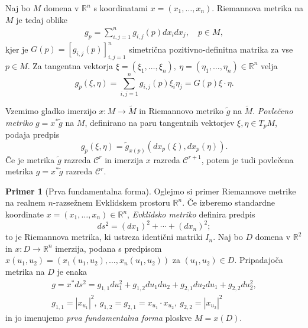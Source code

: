 \documentclass[12pt,a4paper,twoside]{article}
\theoremstyle{definition} %
\newtheorem{primer}[definicija]{Primer}
\theoremstyle{plain} %
\numberwithin{equation}{section}  %
\newcommand{\R}{\mathbb R}
\begin{document}
Naj bo $M$ domena v $\R^{n}$ s koordinatami $x = (x_{1}, \dots, x_{n})$. Riemannova metrika na $M$ je tedaj oblike
\begin{align}
g_{p} = \sum_{i,j=1}^{n} g_{i,j}(p) dx_{i} dx_{j}, \quad p \in M,
\end{align}
kjer je $G(p) = [g_{i,j}(p)]_{i,j=1}^{n}$ simetrična pozitivno-definitna matrika za vse $p \in M$. Za tangentna vektorja $\xi = (\xi_{1}, \dots, \xi_{n}), \ \eta = (\eta_{1}, \dots, \eta_{n}) \in \R^{n}$ velja
\begin{equation}
g_{p}(\xi, \eta) = \sum_{i,j=1}^{n} g_{i,j}(p) \xi_{i} \eta_{j} = G(p) \xi \cdot \eta.
\end{equation}

Vzemimo gladko imerzijo $x \colon M \to \widetilde{M}$ in Riemannovo metriko $\tilde{g}$ na $\widetilde{M}$. \emph{Povlečeno metriko} $g = x^{*} \tilde{g}$ na $M$, definirano na paru tangentnih vektorjev $\xi, \eta \in T_{p}M$, podaja predpis
\begin{equation} \label{eq:pullback-metrika}
g_{p}(\xi, \eta) = \tilde{g}_{x(p)} (dx_{p}(\xi), dx_{p}(\eta)).
\end{equation}
Če je metrika $\tilde{g}$ razreda $\mathcal{C}^{r}$ in imerzija $x$ razreda $\mathcal{C}^{r+1}$, potem je tudi povlečena metrika $g = x^{*} \tilde{g}$ razreda $\mathcal{C}^{r}$.

\begin{primer}[Prva fundamentalna forma]
Oglejmo si primer Riemannove metrike na realnem $n$-razsežnem Evklidskem prostoru $\mathbb{R}^{n}$.
Če izberemo standardne koordinate $x = (x_{1}, \dots, x_{n}) \in \mathbb{R}^{n}$, \emph{Evklidsko metriko} definira predpis
\begin{equation}
ds^2 = (dx_{1})^2 + \cdots + (dx_{n})^2;
\end{equation}
to je Riemannova metrika, ki ustreza identični matriki $I_{n}$. Naj bo $D$ domena v $\R^2$ in $x \colon D \to \R^{n}$ imerzija, podana s predpisom $x(u_1,u_2) = (x_{1}(u_1,u_2), \dots, x_{n}(u_1,u_2))$ za $(u_1,u_2) \in D$. Pripadajoča metrika na $D$ je enaka
\begin{gather*}
g = x^{*}ds^2 = g_{1,1}du_{1}^2 + g_{1,2}du_{1}du_{2} + g_{2,1}du_{2}du_{1} + g_{2,2}du_{2}^2, \\
g_{1,1} = |x_{u_1}|^2, \ g_{1,2} = g_{2,1} = x_{u_1} \cdot x_{u_2}, \ g_{2,2} = |x_{u_2}|^2
\end{gather*}
in jo imenujemo \emph{prva fundamentalna forma} ploskve $M = x(D)$.
\end{primer}
\end{document}
